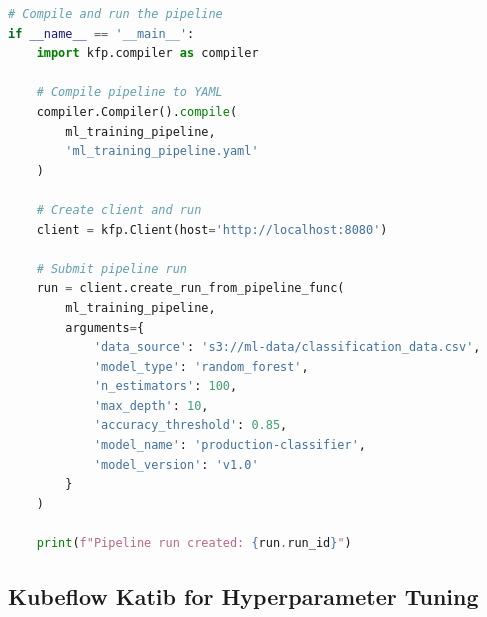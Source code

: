 \begin{lstlisting}[language=Python, caption=Complete Kubeflow Pipeline Example]
# Compile and run the pipeline
if __name__ == '__main__':
    import kfp.compiler as compiler

    # Compile pipeline to YAML
    compiler.Compiler().compile(
        ml_training_pipeline,
        'ml_training_pipeline.yaml'
    )

    # Create client and run
    client = kfp.Client(host='http://localhost:8080')

    # Submit pipeline run
    run = client.create_run_from_pipeline_func(
        ml_training_pipeline,
        arguments={
            'data_source': 's3://ml-data/classification_data.csv',
            'model_type': 'random_forest',
            'n_estimators': 100,
            'max_depth': 10,
            'accuracy_threshold': 0.85,
            'model_name': 'production-classifier',
            'model_version': 'v1.0'
        }
    )

    print(f"Pipeline run created: {run.run_id}")
\end{lstlisting}

\subsection{Kubeflow Katib for Hyperparameter Tuning}

